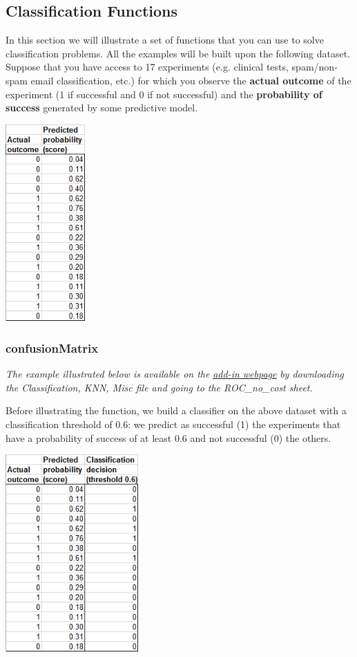 \documentclass[12pt]{article}
\begin{document}
\subsection{Classification Functions}

In this section we will illustrate a set of functions that you can use to solve classification problems. All the examples will be built upon the following dataset. Suppose that you have access to 17 experiments (e.g. clinical tests, spam/non-spam email classification, etc.) for which you observe the \textbf{actual outcome} of the experiment (1 if successful and 0 if not successful) and the \textbf{probability of success} generated by some predictive model.

\medskip

\centerline{\includegraphics[width=1.2in]{figures/conf1.png}}

\medskip

\subsubsection{confusionMatrix}

\textit{The example illustrated below is available on the}  \href{https://www8.gsb.columbia.edu/bizanalytics/excel-add-in/multiplatform#h-4}{ \textit{add-in webpage}}
 \textit{by downloading the Classification, KNN, Misc file and going to the ROC\_no\_cost sheet.}

Before illustrating the function, we build a classifier on the above dataset with a classification threshold of $0.6$: we predict as successful (1) the experiments that have a probability of success of at least $0.6$ and not successful (0) the others.

\medskip

\centerline{\includegraphics[width=2in]{figures/conf2.png}}
\end{document}
